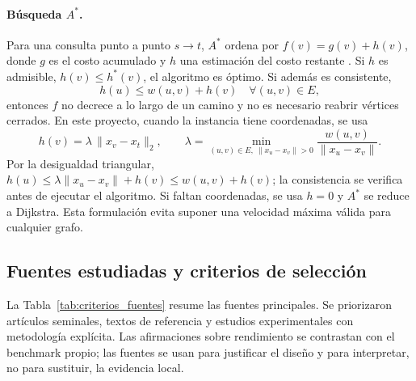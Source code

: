 \paragraph{Búsqueda $A^*$.} Para una consulta punto a punto $s\to t$, $A^*$ ordena por $f(v)=g(v)+h(v)$, donde $g$ es el costo acumulado y $h$ una estimación del costo restante \parencite{hart1968formal}. Si $h$ es admisible, $h(v)\le h^*(v)$, el algoritmo es óptimo. Si además es consistente,
\begin{equation}
    h(u)\le w(u,v)+h(v)\quad\forall (u,v)\in E,
    \label{eq:consistencia}
\end{equation}
entonces $f$ no decrece a lo largo de un camino y no es necesario reabrir vértices cerrados. En este proyecto, cuando la instancia tiene coordenadas, se usa
\begin{equation}
    h(v)=\lambda\,\lVert x_v-x_t\rVert_2,\qquad \lambda=\min_{(u,v)\in E,\ \lVert x_u-x_v\rVert>0}\frac{w(u,v)}{\lVert x_u-x_v\rVert}.
    \label{eq:heuristica_escalada}
\end{equation}
Por la desigualdad triangular, $h(u)\le \lambda\lVert x_u-x_v\rVert+h(v)\le w(u,v)+h(v)$; la consistencia se verifica antes de ejecutar el algoritmo. Si faltan coordenadas, se usa $h=0$ y $A^*$ se reduce a Dijkstra. Esta formulación evita suponer una velocidad máxima válida para cualquier grafo.

\subsection{Fuentes estudiadas y criterios de selección}
La Tabla~\ref{tab:criterios_fuentes} resume las fuentes principales. Se priorizaron artículos seminales, textos de referencia y estudios experimentales con metodología explícita. Las afirmaciones sobre rendimiento se contrastan con el benchmark propio; las fuentes se usan para justificar el diseño y para interpretar, no para sustituir, la evidencia local.

